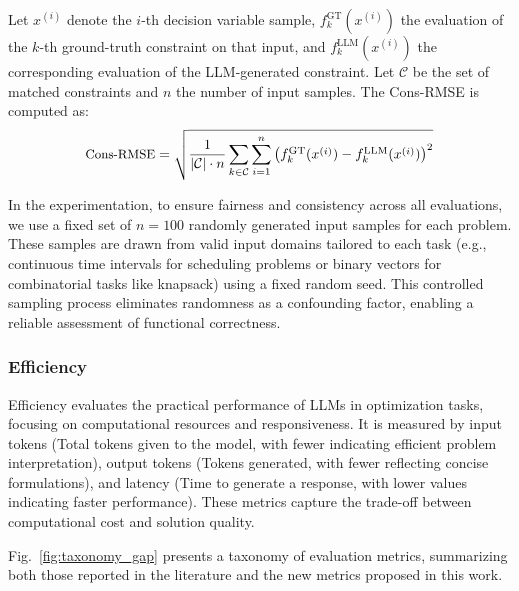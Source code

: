 \documentclass[review,12pt]{elsarticle}
\begin{document}
Let \( x^{(i)} \) denote the $i$-th decision variable sample, \( f_k^{\text{GT}}(x^{(i)}) \) the evaluation of the $k$-th ground-truth constraint on that input, and \( f_k^{\text{LLM}}(x^{(i)}) \) the corresponding evaluation of the LLM-generated constraint. Let \( \mathcal{C} \) be the set of matched constraints and \( n \) the number of input samples. The Cons-RMSE is computed as:
\begin{equation}
\small
\text{Cons-RMSE} = \sqrt{
\frac{1}{|\mathcal{C}| \cdot n}
\sum_{k \in \mathcal{C}} \sum_{i=1}^{n}
\left( f_k^{\text{GT}}(x^{(i)}) - f_k^{\text{LLM}}(x^{(i)}) \right)^2}
\label{eq:cons-rmse}
\end{equation}

In the experimentation, to ensure fairness and consistency across all evaluations, we use a fixed set of \( n = 100 \) randomly generated input samples for each problem. These samples are drawn from valid input domains tailored to each task (e.g., continuous time intervals for scheduling problems or binary vectors for combinatorial tasks like knapsack) using a fixed random seed. This controlled sampling process eliminates randomness as a confounding factor, enabling a reliable assessment of functional correctness.



\vspace{-3mm}
\subsubsection{Efficiency}\label{efficiency}

Efficiency evaluates the practical performance of LLMs in optimization tasks, focusing on computational resources and responsiveness. It is measured by input tokens (Total tokens given to the model, with fewer indicating efficient problem interpretation), output tokens (Tokens generated, with fewer reflecting concise formulations), and latency (Time to generate a response, with lower values indicating faster performance). These metrics capture the trade-off between computational cost and solution quality.

Fig.~\ref{fig:taxonomy_gap} presents a taxonomy of evaluation metrics, summarizing both those reported in the literature and the new metrics proposed in this work.
\end{document}
